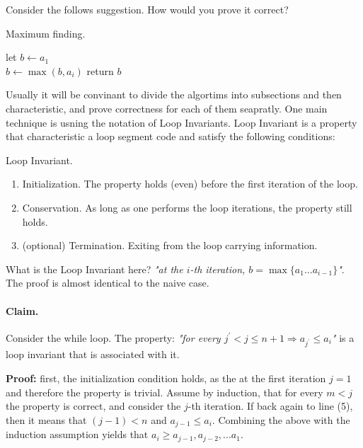Consider the follows suggestion. How would you prove it correct?  
\begin{algbox}{Maximum finding.}
\begin{algorithm*}[H]
{}
 let \(b \leftarrow a_1 \) \\ 
  { 
        \(b \leftarrow \max \left(b, a_i \right) \)
    } 
 return \( b \) 
\end{algorithm*}
\end{algbox}

Usually it will be convinant to divide the algortims into subsections and then characteristic, and prove correctness for each of them seapratly. One main technique is usning the notation of Loop Invariants. Loop Invariant is a property that characteristic a loop segment code  and satisfy the following conditions: 
\begin{defbox}{Loop Invariant.} 
\begin{enumerate}
    \item Initialization. The property holds (even) before the first iteration of the loop.   
    \item Conservation. As long as one performs the loop iterations, the property still holds.
    \item (optional) Termination. Exiting from the loop carrying information.
\end{enumerate}
\end{defbox}


What is the Loop Invariant here? \textit{"at the \(i\)-th iteration, \(b = \max{ \{ a_1 ... a_{i-1} \} } \)"}. The proof is almost identical to the naive case.   

\paragraph{Claim.} Consider the while loop. The property: \textit{"for every \(j^\prime < j \le n+1 \Rightarrow a_{j^\prime} \le a_i \)"} is a loop invariant that is associated with it. 

\textbf{Proof:} first, the initialization condition holds, as the at the first iteration \(j=1\) and therefore the property is trivial.
Assume by induction, that for every \(m < j\) the property is correct, and consider the \(j\)-th iteration. If back again to line (5), then it means that \( (j-1) < n\) and \( a_{j-1} \le a_{i} \). Combining the above with the induction assumption yields that \(a_i \ge a_{j-1},a_{j-2}, ... a_{1}\).    

